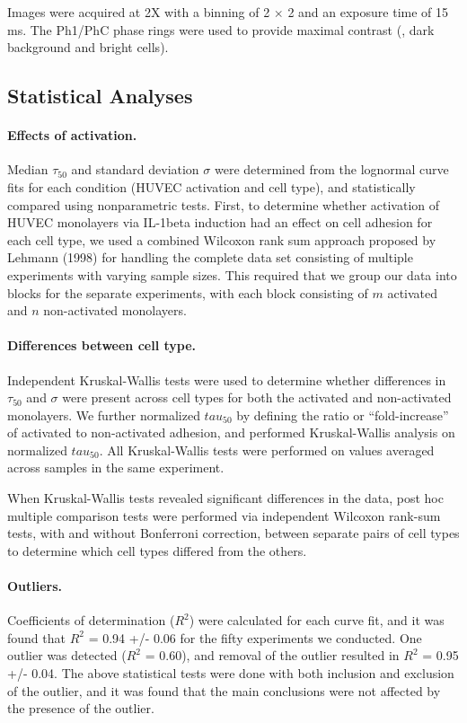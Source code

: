 Images were acquired at 2X with a binning of 2 $\times$ 2 and an exposure time of 15 ms. The Ph1/PhC phase rings were used to provide maximal contrast (\ie, dark background and bright cells).

\subsection{Statistical Analyses}

\paragraph{Effects of activation.} Median $\tau_{50}$ and standard deviation $\sigma$ were determined from the lognormal curve fits for each condition (HUVEC activation and cell type), and statistically compared using nonparametric tests. First, to determine whether activation of HUVEC monolayers via IL-1beta induction had an effect on cell adhesion for each cell type, we used a combined Wilcoxon rank sum approach proposed by Lehmann (1998) for handling the complete data set consisting of multiple experiments with varying sample sizes. This required that we group our data into blocks for the separate experiments, with each block consisting of $m$ activated and $n$ non-activated monolayers.

\paragraph{Differences between cell type.} Independent Kruskal-Wallis tests were used to determine whether differences in $\tau_{50}$ and $\sigma$ were present across cell types for both the activated and non-activated monolayers. We further normalized $tau_{50}$ by defining the ratio or ``fold-increase'' of activated to non-activated adhesion, and performed Kruskal-Wallis analysis on normalized $tau_{50}$. All Kruskal-Wallis tests were performed on values averaged across samples in the same experiment.

When Kruskal-Wallis tests revealed significant differences in the data, post hoc multiple comparison tests were performed via independent Wilcoxon rank-sum tests, with and without Bonferroni correction, between separate pairs of cell types to determine which cell types differed from the others. 

\paragraph{Outliers.} Coefficients of determination ($R^{2}$) were calculated for each curve fit, and it was found that $R^{2}$ = 0.94 +/- 0.06 for the fifty experiments we conducted. One outlier was detected ($R^{2}$ = 0.60), and removal of the outlier resulted in $R^{2}$ = 0.95 +/- 0.04. The above statistical tests were done with both inclusion and exclusion of the outlier, and it was found that the main conclusions were not affected by the presence of the outlier.





